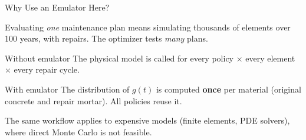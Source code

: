\begin{frame}{Why Use an Emulator Here?}

\justifying

Evaluating \emph{one} maintenance plan means simulating thousands of elements over 100 years, with repairs. The optimizer tests \emph{many} plans.

\vspace{0.3cm}

\begin{alertblock}{Without emulator}
\justifying
The physical model is called for every policy $\times$ every element $\times$ every repair cycle.
\end{alertblock}

\vspace{0.2cm}

\begin{exampleblock}{With emulator}
\justifying
The distribution of $g(t)$ is computed \textbf{once} per material (original concrete and repair mortar). All policies reuse it.
\end{exampleblock}

\vspace{0.3cm}

\raggedright
The same workflow applies to expensive models (finite elements, PDE solvers), where direct Monte Carlo is not feasible.

\end{frame}
